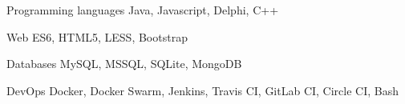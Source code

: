 

\begin{cvskills}

  \cvskill
    {Programming languages} %
    {Java, Javascript, Delphi, C++} %

  \cvskill
    {Web} %
    {ES6, HTML5, LESS, Bootstrap} %

  \cvskill
    {Databases} %
    {MySQL, MSSQL, SQLite, MongoDB} %

  \cvskill
    {DevOps} %
    {Docker, Docker Swarm, Jenkins, Travis CI, GitLab CI, Circle CI, Bash} %

\end{cvskills}
